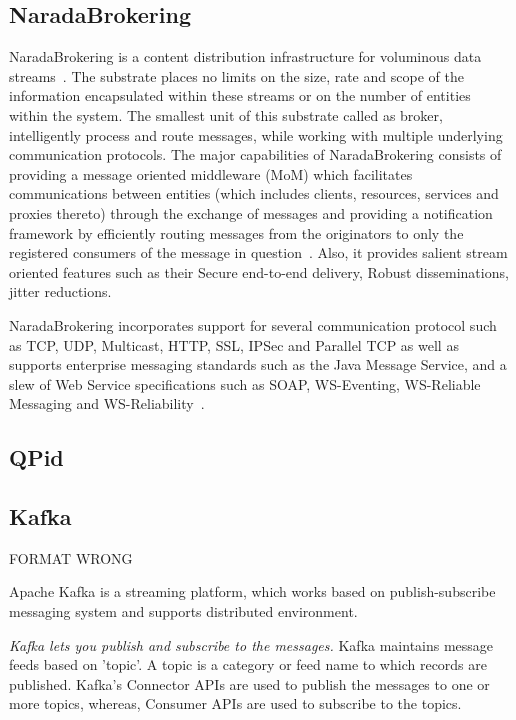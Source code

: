         \pv

\subsection{NaradaBrokering}

NaradaBrokering is a content distribution infrastructure for
voluminous data streams~\cite{www-narada}.  The substrate places no
limits on the size, rate and scope of the information encapsulated
within these streams or on the number of entities within the
system. The smallest unit of this substrate called as broker,
intelligently process and route messages, while working with multiple
underlying communication protocols. The major capabilities of
NaradaBrokering consists of providing a message oriented middleware
(MoM) which facilitates communications between entities (which
includes clients, resources, services and proxies thereto) through the
exchange of messages and providing a notification framework by
efficiently routing messages from the originators to only the
registered consumers of the message in
question~\cite{paper-nb-sustrate}. Also, it provides salient stream
oriented features such as their Secure end-to-end delivery, Robust
disseminations, jitter reductions.

NaradaBrokering incorporates support for several communication
protocol such as TCP, UDP, Multicast, HTTP, SSL, IPSec and Parallel
TCP as well as supports enterprise messaging standards such as the
Java Message Service, and a slew of Web Service specifications such as
SOAP, WS-Eventing, WS-Reliable Messaging and
WS-Reliability~\cite{www-narada-features}.

     \pv

     
\subsection{QPid}

\pv

\subsection{Kafka}

     FORMAT WRONG 

     Apache Kafka is a streaming platform, which works based on
     publish-subscribe messaging system and supports distributed
     environment.
      
     \textit{Kafka lets you publish and subscribe to the messages.} Kafka
     maintains message feeds based on 'topic'. A topic is a category
     or feed name to which records are published. Kafka's Connector
     APIs are used to publish the messages to one or more topics,
     whereas, Consumer APIs are used to subscribe to the topics.

